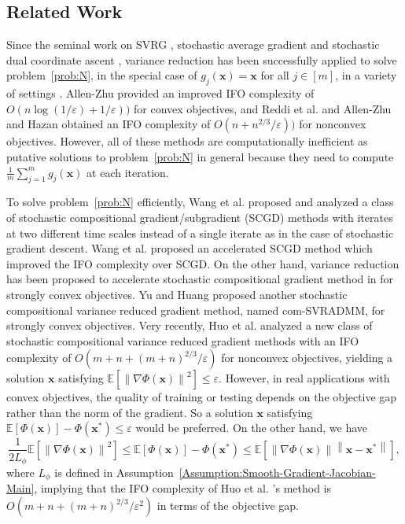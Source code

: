\documentclass[11pt]{article}
\newcommand{\BE}{\mathbb{E}}
\newcommand{\x}{\mathbf x}
\newcommand{\etal}{{et al. }}
\begin{document}
\subsection{Related Work}
Since the seminal work on SVRG \cite{Johnson-2013-Accelerating}, stochastic average gradient \cite{Schmidt-2017-Minimizing} and stochastic dual coordinate ascent \cite{Shalev-2013-Stochastic}, variance reduction has been successfully applied to solve problem~\eqref{prob:N}, in the special case of $g_j(\x)=\x$ for all $j\in[m]$, in a variety of settings \cite{Allen-2016-Improved, Shamir-2016-Fast, Allen-2016-Variance, Reddi-2016-Stochastic, Allen-2017-Natasha, Lei-2017-Nonconvex}. 
Allen-Zhu \cite{Allen-2016-Improved} provided an improved IFO complexity of $O(n\log(1/\varepsilon)+1/\varepsilon))$ for convex objectives, and Reddi \etal \cite{Reddi-2016-Stochastic} and Allen-Zhu and Hazan \cite{Allen-2016-Variance} obtained an IFO complexity of $O(n+n^{2/3}/\varepsilon))$ for nonconvex objectives. However, all of these methods are computationally inefficient as putative solutions to problem~\eqref{prob:N} in general because they need to compute $\frac{1}{m}\sum_{j=1}^m g_j(\x)$ at each iteration. 

To solve problem~\eqref{prob:N} efficiently, Wang \etal \cite{Wang-2017-Stochastic} proposed and analyzed a class of stochastic compositional gradient/subgradient (SCGD) methods with iterates at two different time scales instead of a single iterate as in the case of stochastic gradient descent. Wang \etal \cite{Wang-2017-Accelerating} proposed an accelerated SCGD method which improved the IFO complexity over SCGD. On the other hand, variance reduction has been proposed to accelerate stochastic compositional gradient method in \cite{Lian-2017-Finite} for strongly convex objectives. Yu and Huang \cite{Yu-2017-Fast} proposed another stochastic compositional variance reduced gradient method, named com-SVRADMM, for strongly convex objectives. Very recently, Huo \etal \cite{Huo-2017-Accelerated} analyzed a new class of stochastic compositional variance reduced gradient methods with an IFO complexity of $O(m+n+(m+n)^{2/3}/\varepsilon)$ for nonconvex objectives, yielding a solution $\x$ satisfying $\BE\left[ \left\|\nabla\Phi(\x)\right\|^2\right] \leq \varepsilon$. However, in real applications with convex objectives, the quality of training or testing depends on the objective gap rather than the norm of the gradient. So a solution $\x$ satisfying $\BE\left[ \Phi(\x)\right] - \Phi(\x^*) \leq \varepsilon$ would be preferred. On the other hand, we have 
\begin{equation}
\frac{1}{2L_\phi}\BE\left[ \left\|\nabla\Phi(\x)\right\|^2\right] \leq \BE\left[ \Phi(\x)\right] - \Phi(\x^*) \leq \BE\left[ \left\|\nabla\Phi(\x)\right\|\left\|\x - \x^*\right\|\right],
\end{equation}
where $L_\phi$ is defined in Assumption~\ref{Assumption:Smooth-Gradient-Jacobian-Main}, implying that the IFO complexity of Huo \etal's method is $O(m+n+(m+n)^{2/3}/\varepsilon^2)$ in terms of the objective gap.
\end{document}
